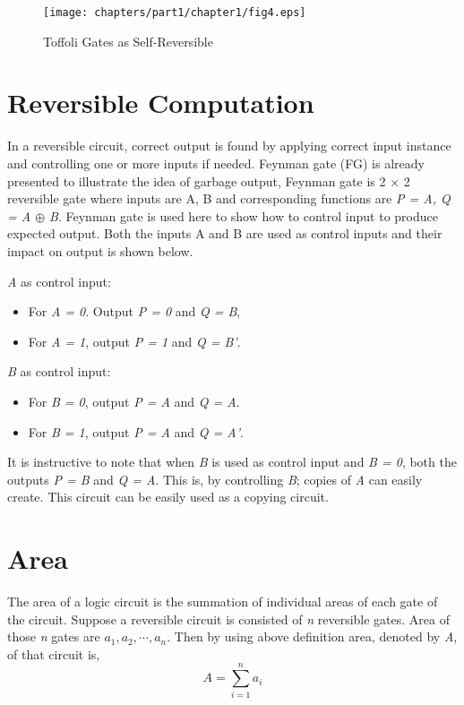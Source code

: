 \begin{figure}[h]
\centering
\texttt{[image: chapters/part1/chapter1/fig4.eps]}
\caption{Toffoli Gates as Self-Reversible}
\label{fig:p1_c1_fig4}
\end{figure}

\section{Reversible Computation}
In a reversible circuit, correct output is found by applying correct input instance and controlling one or more inputs if needed. Feynman gate (FG) is already presented to illustrate the idea of garbage output, Feynman gate is 2 $\times$ 2 reversible gate where inputs are A, B and corresponding functions are \textit{P = A, Q = A $\oplus$ B}. Feynman gate is used here to show how to control input to produce expected output. Both the inputs A and B are used as control inputs and their impact on output is shown below.

\textit{A} as control input:
\begin{itemize}
\item { } For \textit{A = 0}. Output \textit{P = 0 }and \textit{Q = B},
\item { } For \textit{A = 1}, output \textit{P = 1} and \textit{Q = B'}.

\end{itemize}

\textit{B} as control input:
\begin{itemize}
\item For \textit{B = 0}, output \textit{P = A} and \textit{Q = A}.
\item For \textit{B = 1}, output \textit{P = A} and\textit{ Q = A'}.

\end{itemize}

It is instructive to note that when \textit{B} is used as control input and \textit{B = 0}, both the outputs \textit{P = B} and \textit{Q = A}. This is, by controlling \textit{B}; copies of \textit{A} can easily create. This circuit can be easily used as a copying circuit.

\section{Area}
The area of a logic circuit is the summation of individual areas of each gate of the circuit. Suppose a reversible circuit is consisted of \textit{n} reversible gates. Area of those \textit{n} gates are $a_1, a_2,\cdots, a_n$. Then by using above definition area, denoted by \textit{A}, of that circuit is,
\begin{equation*}
A=\sum_{i=1}^{n}a_i
\end{equation*}


